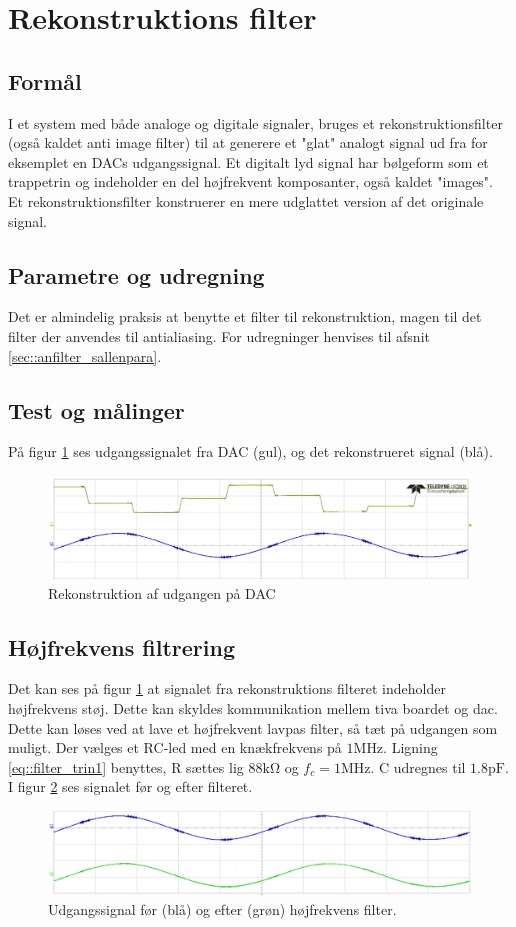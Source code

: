 \section{Rekonstruktions filter}
\subsection{Formål}
I et system med både analoge og digitale signaler, bruges et rekonstruktionsfilter (også kaldet anti image filter) til at generere et "glat" analogt signal ud fra for eksemplet en DACs udgangssignal. Et digitalt lyd signal har bølgeform som et trappetrin og indeholder en del højfrekvent komposanter, også kaldet "images". Et rekonstruktionsfilter konstruerer en mere udglattet version af det originale signal.
\subsection{Parametre og udregning}
Det er almindelig praksis at benytte et filter til rekonstruktion, magen til det filter der anvendes til antialiasing. For udregninger henvises til afsnit \ref{sec::anfilter_sallenpara}.

\subsection{Test og målinger}
På figur \ref{fig::anfilter_recon} ses udgangssignalet fra DAC (gul), og det rekonstrueret signal (blå).
\begin{figure}[h!]
	\centering
	\includegraphics[scale = 0.4]{./billeder/reconstruction}
	\caption{Rekonstruktion af udgangen på DAC}
	\label{fig::anfilter_recon}
\end{figure}
\FloatBlock

\subsection{Højfrekvens filtrering}
Det kan ses på figur \ref{fig::anfilter_recon} at signalet fra rekonstruktions filteret indeholder højfrekvens støj. Dette kan skyldes kommunikation mellem tiva boardet og dac. \\
Dette kan løses ved at lave et højfrekvent lavpas filter, så tæt på udgangen som muligt. Der vælges et RC-led med en knækfrekvens på $1\si{\mega\hertz}$. Ligning \ref{eq::filter_trin1} benyttes, R sættes lig $88\si{\kilo\ohm}$ og $f_c = 1\si{\mega\hertz}$. C udregnes til $1.8\si{\pico\farad}$. I figur \ref{fig::anfilter_hf} ses signalet før og efter filteret.


\begin{figure}[h!]
	\centering
	\includegraphics[scale = 0.4]{./billeder/hf.png}
	\caption{Udgangssignal før (blå) og efter (grøn) højfrekvens filter.}
	\label{fig::anfilter_hf}
\end{figure}
